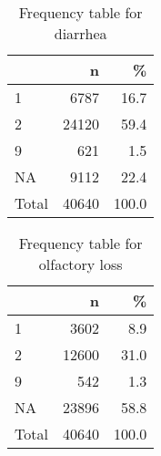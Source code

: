 \documentclass[
]{article}
\newenvironment{Shaded}{\begin{snugshade}}{\end{snugshade}}
\newcommand{\DataTypeTok}[1]{\textcolor[rgb]{0.13,0.29,0.53}{#1}}
\newcommand{\DecValTok}[1]{\textcolor[rgb]{0.00,0.00,0.81}{#1}}
\newcommand{\KeywordTok}[1]{\textcolor[rgb]{0.13,0.29,0.53}{\textbf{#1}}}
\newcommand{\NormalTok}[1]{#1}
\newcommand{\OperatorTok}[1]{\textcolor[rgb]{0.81,0.36,0.00}{\textbf{#1}}}
\newcommand{\OtherTok}[1]{\textcolor[rgb]{0.56,0.35,0.01}{#1}}
\newcommand{\StringTok}[1]{\textcolor[rgb]{0.31,0.60,0.02}{#1}}
\begin{document}
\begin{table}[!h]

\caption{\label{tab:unnamed-chunk-58}Frequency table for diarrhea}
\centering
\begin{tabular}[t]{l|r|r}
\hline
  & n & \%\\
\hline
1 & 6787 & 16.7\\
\hline
2 & 24120 & 59.4\\
\hline
9 & 621 & 1.5\\
\hline
NA & 9112 & 22.4\\
\hline
Total & 40640 & 100.0\\
\hline
\end{tabular}
\end{table}

\begin{Shaded}
\end{Shaded}

\begin{table}[!h]

\caption{\label{tab:unnamed-chunk-59}Frequency table for olfactory loss}
\centering
\begin{tabular}[t]{l|r|r}
\hline
  & n & \%\\
\hline
1 & 3602 & 8.9\\
\hline
2 & 12600 & 31.0\\
\hline
9 & 542 & 1.3\\
\hline
NA & 23896 & 58.8\\
\hline
Total & 40640 & 100.0\\
\hline
\end{tabular}
\end{table}
\end{document}
